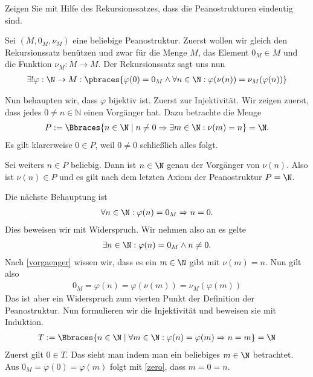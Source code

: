 \begin{exercise}
    Zeigen Sie mit Hilfe des Rekursionssatzes, dass die Peanostrukturen eindeutig sind.
\end{exercise}
\begin{solution}
    Sei $(M,0_M, \nu_M)$ eine beliebige Peanostruktur.
    Zuerst wollen wir gleich den Rekursionssatz benützen und zwar für die Menge $M$, das Element $0_M \in M$ und die Funktion $\nu_M: M \to M$. Der Rekursionssatz sagt uns nun
    \begin{align*}
        \exists! \varphi: \N \to M : \pbraces{\varphi(0) = 0_M \land \forall n \in \N : \varphi(\nu(n)) = \nu_M(\varphi(n))}
    \end{align*}

    Nun behaupten wir, dass $\varphi$ bijektiv ist. Zuerst zur Injektivität.
    Wir zeigen zuerst, dass jedes $ 0 \neq n \in \mathbb{N}$ einen Vorgänger hat.
    Dazu betrachte die Menge
    \begin{align}\label{vorgaenger}
       P := \Bbraces{n \in \N \mid n \neq 0 \Rightarrow \exists m \in \N: \nu(m) = n} = \N.
    \end{align}
    Es gilt klarerweise $0 \in P$, weil $0 \neq 0$ schließlich alles folgt.

    Sei weiters $n \in P$ beliebig. Dann ist $n \in \N$ genau der Vorgänger von $\nu(n)$. Also ist $\nu(n) \in P$ und es gilt nach dem letzten Axiom der Peanostruktur $P = \N$.

    Die nächste Behauptung ist
    \begin{align}\label{zero}
        \forall n \in \N: \varphi(n) = 0_M \Rightarrow n = 0.
    \end{align}
    Dies beweisen wir mit Widerspruch. Wir nehmen also an es gelte
    \begin{align*}
        \exists n \in \N: \varphi(n) = 0_M \land n \neq 0.
    \end{align*}
    Nach \eqref{vorgaenger} wissen wir, dass es ein $m \in \N$ gibt mit $\nu(m) = n$. Nun gilt also
    \begin{align*}
        0_M = \varphi(n) = \varphi(\nu(m)) = \nu_M(\varphi(m))
    \end{align*}
    Das ist aber ein Widerspruch zum vierten Punkt der Definition der Peanostruktur.
    Nun formulieren wir die Injektivität und beweisen sie mit Induktion.
    \begin{align*}
        T:= \Bbraces{n \in \N \mid \forall m \in \N: \varphi(n) = \varphi(m) \Rightarrow n = m} = \N
    \end{align*}
    Zuerst gilt $0 \in T$. Das sieht man indem man ein beliebiges $m \in \N$ betrachtet. Aus $0_M = \varphi(0) = \varphi(m)$ folgt mit \eqref{zero}, dass $m = 0 = n$.


\end{solution}
